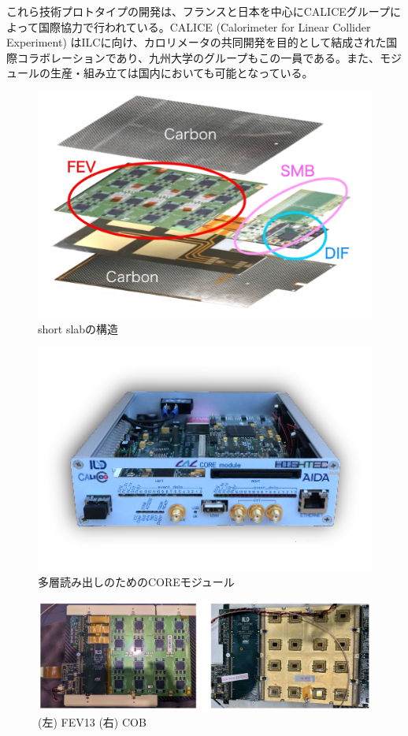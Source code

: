 これら技術プロトタイプの開発は、フランスと日本を中心にCALICEグループによって国際協力で行われている。CALICE (Calorimeter for Linear Collider Experiment) はILCに向け、カロリメータの共同開発を目的として結成された国際コラボレーションであり、九州大学のグループもこの一員である。また、モジュールの生産・組み立ては国内においても可能となっている。
\begin{figure}[h]
	\begin{center}
	\includegraphics[keepaspectratio, scale=0.7]
 	{Figure/Siwecal/shortslab.png}
 		\caption{short slabの構造}
 		\label{shortslab}
	\end{center}
 \end{figure}
  \begin{figure}[ht]
	\begin{center}
	\includegraphics[keepaspectratio, scale=0.7]
 	{Figure/Siwecal/core.png}
 		\caption{多層読み出しのためのCOREモジュール}
 		\label{core}
	\end{center}
 \end{figure}
 \begin{figure}[ht]
	\begin{center}
	\includegraphics[keepaspectratio, scale=0.3]
 	{Figure/Siwecal/fevcob.png}
 		\caption[FEV13(BGA), COB]{(左) FEV13 (右) COB}
 		\label{fevcob}
	\end{center}
 \end{figure}